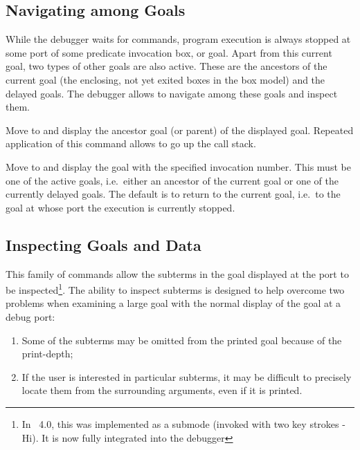 \subsection{Navigating among Goals}

While the debugger waits for commands, program execution is always
stopped at some port of some predicate invocation box, or goal.
Apart from this current goal, two types of other goals are also active.
These are the ancestors of the current goal (the enclosing, not yet
exited boxes in the box model) and the delayed goals.
The debugger allows to navigate among these goals and inspect them.

\begin{descr}{1cm}

Move to and display the ancestor goal (or parent) of the displayed goal.
Repeated application of this command allows to go up the call stack.

Move to and display the goal with the specified invocation number.
This must be one of the active goals, i.e.\ either an ancestor of the
current goal or one of the currently delayed goals. 
The default is to return to the current goal, i.e.\ to the goal at
whose port the execution is currently stopped.
\end{descr}

\subsection{Inspecting Goals and Data}

This family of commands allow the subterms in the goal displayed at the
port to be inspected\footnote{In \eclipse\ 4.0, this was implemented
as a submode (invoked with two key strokes - Hi). It is now fully
integrated into the debugger}.
The ability to inspect subterms is designed to help overcome two problems
when examining a large goal with the normal display of the goal at a debug
port: 
\begin{enumerate}
\item Some of the subterms may be omitted from the printed goal because
of the print-depth; 

\item If the user is interested in particular subterms, it
may be difficult to precisely locate them from the surrounding arguments,
even if it is printed.
\end{enumerate}

